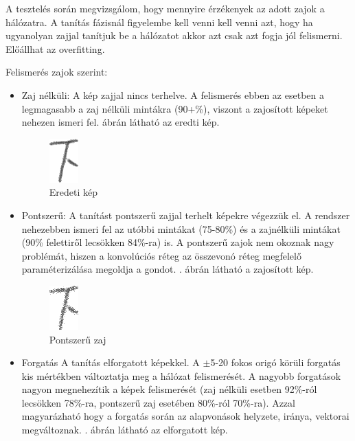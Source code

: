 A tesztelés során megvizsgálom, hogy mennyire érzékenyek az adott zajok a hálózatra. A tanítás fázisnál figyelembe kell venni kell venni azt, hogy ha ugyanolyan zajjal tanítjuk be a  hálózatot akkor azt csak azt fogja jól felismerni. Előállhat az overfitting.

Felismerés zajok szerint:
\begin{itemize}
\item Zaj nélküli: A kép zajjal nincs terhelve. A felismerés ebben az esetben a legmagasabb a zaj nélküli mintákra (90+\%), viszont a zajosított képeket nehezen ismeri fel. ábrán látható az eredti kép.

\begin{figure}[h!]
	\centering
	\includegraphics[scale=1.0]{images/original}
	\caption{Eredeti kép}
	\label{fig:original}
\end{figure}

\item Pontszerű: A tanítást pontszerű zajjal terhelt képekre végezzük el. A rendszer nehezebben ismeri fel az utóbbi mintákat (75-80\%) és a zajnélküli mintákat (90\% felettiről lecsökken 84\%-ra) is. A pontszerű zajok nem okoznak nagy problémát, hiszen a konvolúciós réteg az összevonó réteg megfelelő paraméterizálása megoldja a gondot. . ábrán látható a zajosított kép.

\begin{figure}[h!]
	\centering
	\includegraphics[scale=1.0]{images/noise}
	\caption{Pontszerű zaj}
	\label{fig:noise}
\end{figure}

\item Forgatás A tanítás elforgatott képekkel. A $\pm$5-20 fokos origó körüli forgatás kis mértékben változtatja meg a hálózat felismerését. A nagyobb forgatások nagyon megnehezítik a képek felismerését (zaj nélküli esetben 92\%-ról lecsökken 78\%-ra, pontszerű zaj esetében 80\%-ról 70\%-ra). Azzal magyarázható hogy a forgatás során az alapvonások helyzete, iránya, vektorai megváltoznak. . ábrán látható az elforgatott kép.


\end{itemize}
